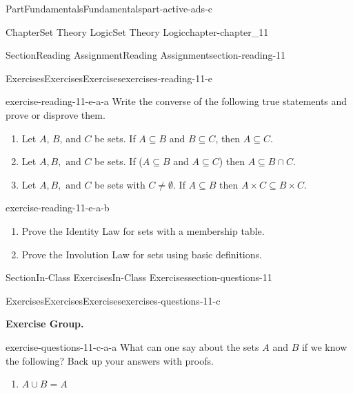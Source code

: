 \documentclass[oneside,10pt,]{book}
\numberwithin{equation}{section}
\begin{document}
\begin{partptx}{Part}{Fundamentals}{}{Fundamentals}{}{}{part-active-ads-c}
\begin{chapterptx}{Chapter}{Set Theory Logic}{}{Set Theory Logic}{}{}{chapter-chapter_11}
\begin{sectionptx}{Section}{Reading Assignment}{}{Reading Assignment}{}{}{section-reading-11}
\begin{exercises-subsection-numberless}{Exercises}{Exercises}{}{Exercises}{}{}{exercises-reading-11-e}
\begin{exercisegroup}
\begin{divisionexerciseeg}{1}{}{}{exercise-reading-11-e-a-a}
Write the converse of the following true statements and prove or disprove them.%
\begin{enumerate}[label=(\alph*)]
\item{}Let \(A\), \(B\), and \(C\) be sets. If \(A\subseteq B\) and \(B\subseteq C\), then \(A\subseteq C\).%
\item{}Let \(A,B, \textrm{ and } C\) be sets. If (\(A\subseteq B\) and \(A\subseteq C\)) then \(A\subseteq B\cap C\).%
\item{}Let \(A,B, \textrm{ and } C\) be sets with \(C\neq \emptyset\). If \(A\subseteq B\) then \(A\times C \subseteq B\times C\).%
\end{enumerate}
%
\end{divisionexerciseeg}%
\begin{divisionexerciseeg}{2}{}{}{exercise-reading-11-e-a-b}%
%
\begin{enumerate}[label=(\alph*)]
\item{}Prove the Identity Law for sets  with a membership table.%
\item{}Prove the Involution Law  for sets using basic definitions.%
\end{enumerate}
%
\end{divisionexerciseeg}%
\end{exercisegroup}
\par\medskip\noindent
\end{exercises-subsection-numberless}
\end{sectionptx}
%
%
\typeout{************************************************}
\typeout{************************************************}
%
\begin{sectionptx}{Section}{In-Class Exercises}{}{In-Class Exercises}{}{}{section-questions-11}
%
%
%
\typeout{************************************************}
\typeout{************************************************}
%
\begin{exercises-subsection-numberless}{Exercises}{Exercises}{}{Exercises}{}{}{exercises-questions-11-c}
\par\medskip\noindent%
\textbf{Exercise Group.}\space\space%
\begin{exercisegroup}
\begin{divisionexerciseeg}{1}{}{}{exercise-questions-11-c-a-a}%
What can one say about the sets \(A\) and \(B\) if we know the following?  Back up your answers with proofs.%
\begin{enumerate}[label=(\alph*)]
\item{}\(\displaystyle A \cup B = A\)%

\end{enumerate}
\end{divisionexerciseeg}
\end{exercisegroup}
\end{exercises-subsection-numberless}
\end{sectionptx}
\end{chapterptx}
\end{partptx}
\end{document}
